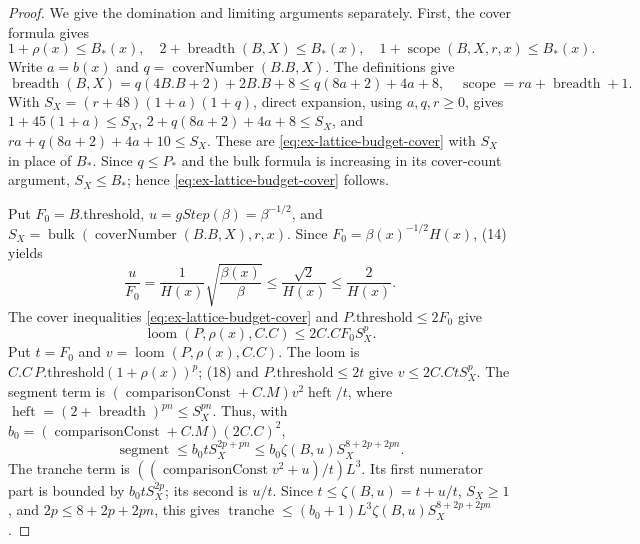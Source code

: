 \begin{proof}
We give the domination and limiting arguments separately. First, the cover
formula gives
\begin{equation}
 1+\rho(x)\le B_*(x),\quad
 2+\operatorname{breadth}(B,X)\le B_*(x),\quad
 1+\operatorname{scope}(B,X,r,x)\le B_*(x).
 \label{eq:ex-lattice-budget-cover}
\end{equation}
Write \(a=b(x)\) and \(q=\operatorname{coverNumber}(B.B,X)\). The
definitions give
\[
 \operatorname{breadth}(B,X)=q(4B.B+2)+2B.B+8
       \le q(8a+2)+4a+8,
 \quad \operatorname{scope}=r a+\operatorname{breadth}+1.
\]
With \(S_X=(r+48)(1+a)(1+q)\), direct expansion, using \(a,q,r\ge0\),
gives \(1+45(1+a)\le S_X\),
\(2+q(8a+2)+4a+8\le S_X\), and
\(r a+q(8a+2)+4a+10\le S_X\). These are \eqref{eq:ex-lattice-budget-cover} with \(S_X\) in place
of \(B_*\). Since \(q\le P_*\) and the bulk formula is increasing in
its cover-count argument, \(S_X\le B_*\); hence \eqref{eq:ex-lattice-budget-cover} follows.

Put \(F_0=B.\mathrm{threshold}\), \(u=gStep(\beta)=\beta^{-1/2}\),
and \(S_X=\operatorname{bulk}(\operatorname{coverNumber}(B.B,X),r,x)\).
Since \(F_0=\beta(x)^{-1/2}H(x)\), (14) yields
\begin{equation}
 \frac{u}{F_0}
 =\frac{1}{H(x)}\sqrt{\frac{\beta(x)}{\beta}}
 \le\frac{\sqrt2}{H(x)}\le\frac{2}{H(x)}.
 \label{eq:ex-lattice-u-over-F}
\end{equation}
The cover inequalities \eqref{eq:ex-lattice-budget-cover} and \(P.\mathrm{threshold}\le2F_0\)
give
\begin{equation}
 \operatorname{loom}(P,\rho(x),C.C)\le
             2C.C F_0 S_X^p.
 \label{eq:ex-lattice-loom-bound}
\end{equation}
Put \(t=F_0\) and \(v=\operatorname{loom}(P,\rho(x),C.C)\). The loom is
\(C.C\,P.\mathrm{threshold}(1+\rho(x))^p\); (18) and
\(P.\mathrm{threshold}\le2t\) give \(v\le2C.CtS_X^p\). The segment
term is \((\operatorname{comparisonConst}+C.M)v^2\operatorname{heft}/t\),
where \(\operatorname{heft}=(2+\operatorname{breadth})^{pn}\le
S_X^{pn}\). Thus, with
\(b_0=(\operatorname{comparisonConst}+C.M)(2C.C)^2\),
\[
 \operatorname{segment}\le b_0 t S_X^{2p+pn}
       \le b_0\zeta(B,u)S_X^{8+2p+2pn}.
\]
The tranche term is
\(((\operatorname{comparisonConst}v^2+u)/t)L^3\). Its first numerator part
is bounded by \(b_0tS_X^{2p}\); its second is \(u/t\). Since
\(t\le\zeta(B,u)=t+u/t\), \(S_X\ge1\), and
\(2p\le8+2p+2pn\), this gives
\(\operatorname{tranche}\le(b_0+1)L^3\zeta(B,u)
S_X^{8+2p+2pn}\).


\end{proof}
